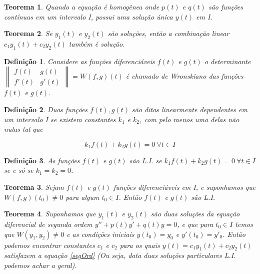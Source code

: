 \documentclass{article}
\newtheorem{theorem}{Teorema}[section]
\newtheorem{definition}{Definição}
\begin{document}
\begin{theorem}
    Quando a equação é homogênea onde $p(t)$ e $q(t)$ são funções contínuas em um intervalo I, possui uma solução única $y(t)$ em I.
\end{theorem}

\begin{theorem}
    Se $y_1(t)$ e $y_2(t)$ são soluções, então a combinação linear $c_1 y_1(t) + c_2 y_2(t)$ também é solução.
\end{theorem}

\begin{definition}
    Considere as funções diferenciáveis $f(t)$ e $g(t)$ o determinante $\left \| \begin{array}{cc}
    f(t) & g(t) \\
    f'(t) & g'(t)
    \end{array} \right \| = W(f, g)(t)$ é chamado de Wronskiano das funções $f(t)$ e $g(t)$.
\end{definition}

\begin{definition}
    Duas funções $f(t), g(t)$ são ditas linearmente dependentes em um intervalo I se existem constantes $k_1$ e $k_2$, com pelo menos uma delas não nulas tal que
    
    $$k_1 f(t) + k_2 g(t) = 0 \ \forall t \in I$$
\end{definition}

\begin{definition}
    As funções $f(t)$ e $g(t)$ são L.I. se $k_1 f(t) + k_2 g(t) = 0 \ \forall t \in I$ se e só se $k_1 = k_2 = 0$.
\end{definition}

\begin{theorem}
    Sejam $f(t)$ e $g(t)$ funções diferenciáveis em I, e suponhamos que $W(f, g)(t_0) \neq 0$ para algum $t_0 \in I$. Então $f(t)$ e $g(t)$ são L.I.
\end{theorem}

\begin{theorem}
    Suponhamos que $y_1(t)$ e $y_2(t)$ são duas soluções da equação diferencial de segunda ordem $y'' + p(t) y' + q(t) y = 0$, e que para $t_0 \in I$ temos que $W(y_1, y_2) \neq 0$ e as condições iniciais $y(t_0) = y_0$ e $y'(t_0) = y'_0$. Então podemos encontrar constantes $c_1$ e $c_2$ para os quais $y(t) = c_1 y_1(t) + c_2 y_2(t)$ satisfazem a equação \ref{segOrd} (Ou seja, data duas soluções particulares L.I. podemos achar a geral).
\end{theorem}
\end{document}
